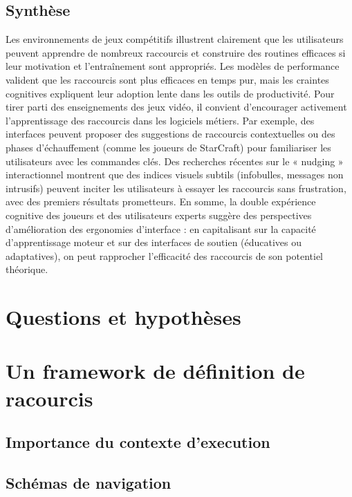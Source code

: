 \documentclass[a4paper,12pt]{article}
\begin{document}
\subsection{Synthèse}
\label{sec:org27b8c72}
Les environnements de jeux compétitifs illustrent clairement que les utilisateurs peuvent apprendre de nombreux raccourcis et construire des routines efficaces si leur motivation et l'entraînement sont appropriés. Les modèles de performance valident que les raccourcis sont plus efficaces en temps pur, mais les craintes cognitives expliquent leur adoption lente dans les outils de productivité. Pour tirer parti des enseignements des jeux vidéo, il convient d'encourager activement l'apprentissage des raccourcis dans les logiciels métiers. Par exemple, des interfaces peuvent proposer des suggestions de raccourcis contextuelles ou des phases d'échauffement (comme les joueurs de StarCraft) pour familiariser les utilisateurs avec les commandes clés. Des recherches récentes sur le « nudging » interactionnel montrent que des indices visuels subtils (infobulles, messages non intrusifs) peuvent inciter les utilisateurs à essayer les raccourcis sans frustration, avec des premiers résultats prometteurs\autocite{raursoIntermodalImprovementNudging2020}. En somme, la double expérience cognitive des joueurs et des utilisateurs experts suggère des perspectives d'amélioration des ergonomies d'interface : en capitalisant sur la capacité d'apprentissage moteur et sur des interfaces de soutien (éducatives ou adaptatives), on peut rapprocher l'efficacité des raccourcis de son potentiel théorique.
\section{Questions et hypothèses}
\label{sec:org1695822}

\section{Un framework de définition de racourcis}
\label{sec:org76a8829}
\subsection{Importance du contexte d'execution}
\label{sec:orgfc0a4ec}

\subsection{Schémas de navigation}
\label{sec:orgd9259fc}
\end{document}
